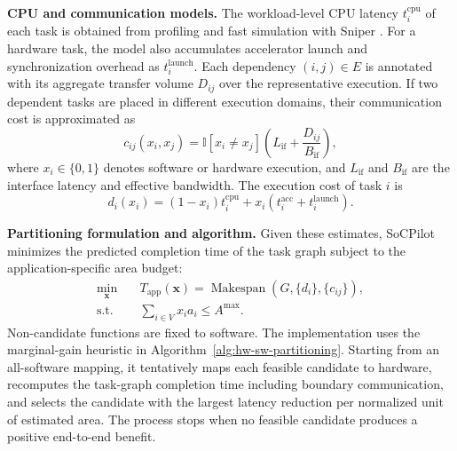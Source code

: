 \textbf{CPU and communication models.}
The workload-level CPU latency $t_i^{\mathrm{cpu}}$ of each task is obtained from profiling and fast simulation with Sniper \cite{sniper}. For a hardware task, the model also accumulates accelerator launch and synchronization overhead as $t_i^{\mathrm{launch}}$. Each dependency $(i,j)\in E$ is annotated with its aggregate transfer volume $D_{ij}$ over the representative execution. If two dependent tasks are placed in different execution domains, their communication cost is approximated as
\begin{equation}
c_{ij}(x_i,x_j)=
\mathbb{I}[x_i\neq x_j]\left(L_{\mathrm{if}}+\frac{D_{ij}}{B_{\mathrm{if}}}\right),
\end{equation}
where $x_i\in\{0,1\}$ denotes software or hardware execution, and $L_{\mathrm{if}}$ and $B_{\mathrm{if}}$ are the interface latency and effective bandwidth. The execution cost of task $i$ is
\begin{equation}
d_i(x_i)=(1-x_i)t_i^{\mathrm{cpu}}+
x_i\left(t_i^{\mathrm{acc}}+t_i^{\mathrm{launch}}\right).
\end{equation}

\textbf{Partitioning formulation and algorithm.}
Given these estimates, SoCPilot minimizes the predicted completion time of the task graph subject to the application-specific area budget:
\begin{equation}
\begin{aligned}
\min_{\mathbf{x}}\quad &T_{\mathrm{app}}(\mathbf{x})
=\operatorname{Makespan}\!\left(G,\{d_i\},\{c_{ij}\}\right),\\
\mathrm{s.t.}\quad &\sum_{i\in V}x_i a_i\leq A^{\max}.
\end{aligned}
\label{eq:partition}
\end{equation}
Non-candidate functions are fixed to software. The implementation uses the marginal-gain heuristic in Algorithm~\ref{alg:hw-sw-partitioning}. Starting from an all-software mapping, it tentatively maps each feasible candidate to hardware, recomputes the task-graph completion time including boundary communication, and selects the candidate with the largest latency reduction per normalized unit of estimated area. The process stops when no feasible candidate produces a positive end-to-end benefit.

